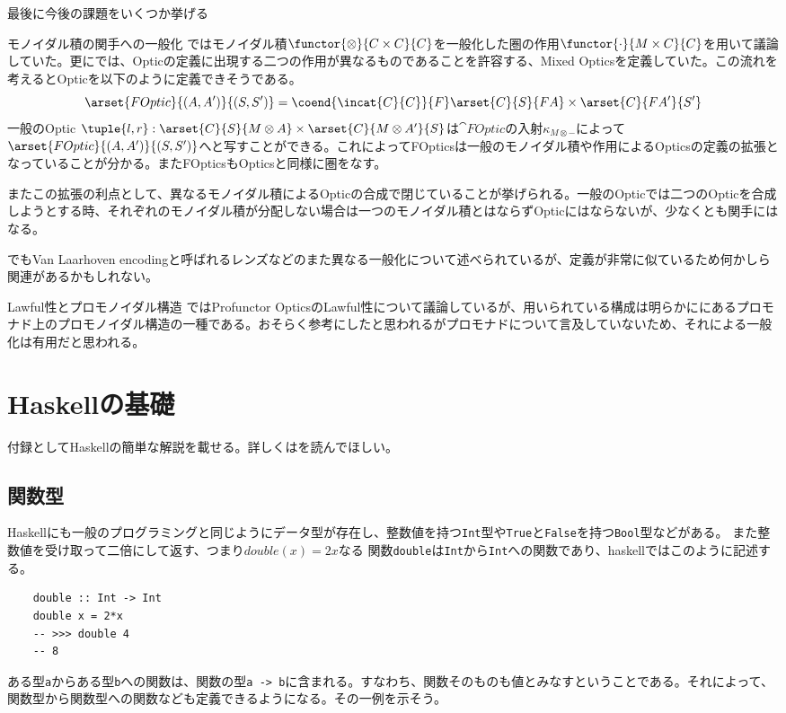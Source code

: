 \documentclass[uplatex,dvipdfmx]{jsarticle}
\newcommand{\pr}[1]{\colorbox[rgb]{0.9,0.9,0.9}{\lstinline{#1}}}
\newcommand{\functype}[2]{\pr{#1 -> #2}}
\begin{document}
  最後に今後の課題をいくつか挙げる
  \begin{mydescription}
    \item[モノイダル積の関手への一般化] \cite{categories_of_optics}ではモノイダル積$\functor{\otimes}{C\times C}{C}$を一般化した圏の作用$\functor{\cdot}{M\times C}{C}$を用いて議論していた。更に\cite{profunctor_optics_update}では、Opticの定義に出現する二つの作用が異なるものであることを許容する、Mixed Opticsを定義していた。この流れを考えるとOpticを以下のように定義できそうである。
    \[\arset{FOptic}{(A,A')}{(S,S')} = \coend{\incat{C}{C}}{F}\arset{C}{S}{FA}\times \arset{C}{FA'}{S'}\]
    一般のOptic $\tuple{l,r}:\arset{C}{S}{M\otimes A}\times \arset{C}{M\otimes A'}{S}$は$\cat{FOptic}$の入射$\kappa_{M\otimes -}$によって$\arset{FOptic}{(A,A')}{(S,S')}$へと写すことができる。これによってFOpticsは一般のモノイダル積や作用によるOpticsの定義の拡張となっていることが分かる。またFOpticsもOpticsと同様に圏をなす。

    またこの拡張の利点として、異なるモノイダル積によるOpticの合成で閉じていることが挙げられる。一般のOpticでは二つのOpticを合成しようとする時、それぞれのモノイダル積が分配しない場合は一つのモノイダル積とはならずOpticにはならないが、少なくとも関手にはなる。

    \cite{profunctor_optics_update}でもVan Laarhoven encodingと呼ばれるレンズなどのまた異なる一般化について述べられているが、定義が非常に似ているため何かしら関連があるかもしれない。
    \item[Lawful性とプロモノイダル構造]\cite{categories_of_optics}ではProfunctor OpticsのLawful性について議論しているが、用いられている構成は明らかに\cite{doubles_for_monoidal}にあるプロモナド上のプロモノイダル構造の一種である。おそらく参考にしたと思われるがプロモナドについて言及していないため、それによる一般化は有用だと思われる。
  \end{mydescription}
  \appendix

  \section{Haskellの基礎}
  付録としてHaskellの簡単な解説を載せる。詳しくは\cite{sugoi_haskell}を読んでほしい。
  \subsection{関数型}
  Haskellにも一般のプログラミングと同じようにデータ型が存在し、整数値を持つ\pr{Int}型や\pr{True}と\pr{False}を持つ\pr{Bool}型などがある。
  また整数値を受け取って二倍にして返す、つまり$double(x)=2x$なる
  関数\pr{double}は\pr{Int}から\pr{Int}への関数であり、haskellではこのように記述する。
  \begin{lstlisting}
    double :: Int -> Int
    double x = 2*x
    -- >>> double 4
    -- 8
  \end{lstlisting}
  ある型\pr{a}からある型\pr{b}への関数は、関数の型\functype{a}{b}に含まれる。すなわち、関数そのものも値とみなすということである。それによって、関数型から関数型への関数なども定義できるようになる。その一例を示そう。
\end{document}
